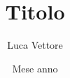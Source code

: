 \documentclass{article}
\title{Titolo}
\author{Luca Vettore}
\date{Mese anno}
\begin{document}


\maketitle






\newpage
\Index
\end{document}
